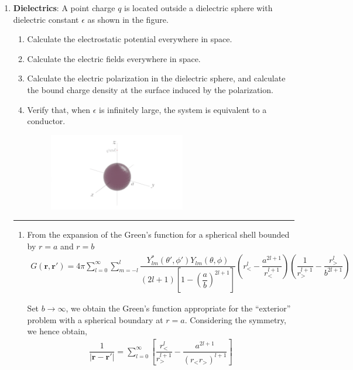 \documentclass[a4paper,9pt]{article}
\begin{document}
\begin{enumerate}
  \item \textbf{Dielectrics}: A point charge $q$ is located outside a dielectric sphere with dielectric constant $\epsilon$ as shown in the figure.
  \begin{enumerate}
    \item Calculate the electrostatic potential everywhere in space.
    \item Calculate the electric fields everywhere in space.
    \item Calculate the electric polarization in the dielectric sphere, and calculate the bound charge density at the surface induced by the polarization.
    \item Verify that, when $\epsilon$ is infinitely large, the system is equivalent to a conductor.
    \begin{figure}[h]
      \centering
      \includegraphics[width=0.6\textwidth]{3.png}
    \end{figure}
  \end{enumerate}
  \rule[0pt]{6cm}{0.05em}
  \begin{enumerate}
    \item From the expansion of the Green's function for a spherical shell bounded by $r=a$ and $r=b$
    \begin{eqnarray}
      G(\boldsymbol{r},\boldsymbol{r}')=4\pi\sum_{l=0}^{\infty}\sum_{m=-l}^{l}\dfrac{Y^*_{lm}(\theta',\phi')Y_{lm}(\theta,\phi)}{(2l+1)\left[1-(\dfrac{a}{b})^{2l+1}\right]}(r^l_{<}-\dfrac{a^{2l+1}}{r_{<}^{l+1}})(\dfrac{1}{r^{l+1}_{>}}-\dfrac{r^l_{>}}{b^{2l+1}})
    \end{eqnarray}
    
    Set $b\to\infty$, we obtain the Green's function appropriate for the ``exterior'' problem with a spherical boundary at $r=a$. Considering the symmetry, we hence obtain,
    \begin{eqnarray}
      \dfrac{1}{|\boldsymbol{r}-\boldsymbol{r}'|}=\sum_{l=0}^{\infty}\left[\dfrac{r^l_{<}}{r^{l+1}_{>}}-\dfrac{a^{2l+1}}{(r_{<}r_{>})^{l+1}}\right]
    \end{eqnarray}


\end{enumerate}
\end{enumerate}
\end{document}
